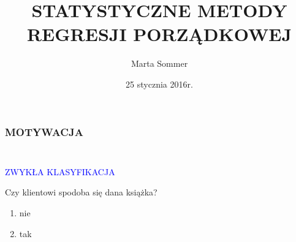 \documentclass[11pt,usenames,dvipsnames,rgb,svgnames,x11names]{beamer}
\title{STATYSTYCZNE METODY \newline REGRESJI PORZĄDKOWEJ}
\author{Marta Sommer}
\institute{MiNI, Politechnika Warszawska}
\date{25 stycznia 2016r.}
\theoremstyle{plain}
\theoremstyle{definition}
\theoremstyle{remark}
\begin{document}
\begin{frame}
	\titlepage
\end{frame}



\begin{frame}
\frametitle{\textbf{MOTYWACJA}}

\begin{columns}[T]
\begin{column}{0.7\textwidth}
\centering
\textcolor{blue}{}
\end{column}

\begin{column}{0.3\textwidth}
\centering
\textcolor{blue}{}
\end{column}
\end{columns}


\begin{columns}[T]

\begin{column}{0.3\textwidth}
\begin{center}
\textcolor{blue}{ZWYKŁA KLASYFIKACJA}
\end{center}
Czy klientowi spodoba się dana książka?
\begin{enumerate}[1)]
\item \textcolor{jeden}{nie}
\item \textcolor{piec}{tak}
\end{enumerate}
\end{column}


\end{columns}
\end{frame}
\end{document}
